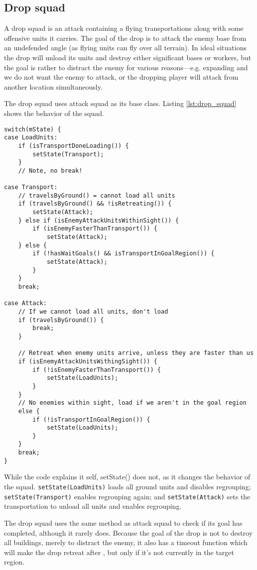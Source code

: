 \subsection{Drop squad}
\label{sec:drop_squad}
A drop squad is an attack containing a flying transportations along with some offensive units it
carries. The goal of the drop is to attack the enemy base from an undefended angle (as flying units
can fly over all terrain). In ideal situations the drop will unload its units and destroy either
significant bases or workers, but the goal is rather to distract the enemy for various reasons—e.g.
expanding and we do not want the enemy to attack, or the dropping player will attack from another
location simultaneously.

The drop squad uses attack squad as its base class. Listing \ref{lst:drop_squad} shows the behavior of the squad.

\clearpage
\begin{lstlisting}[caption={Drop squad behavior},label={lst:drop_squad}]
switch(mState) {
case LoadUnits:
	if (isTransportDoneLoading()) {
		setState(Transport);
	}
	// Note, no break!

case Transport:
	// travelsByGround() = cannot load all units
	if (travelsByGround() && !isRetreating()) {
		setState(Attack);
	} else if (isEnemyAttackUnitsWithinSight()) {
		if (isEnemyFasterThanTransport()) {
			setState(Attack);
	} else {
		if (!hasWaitGoals() && isTransportInGoalRegion()) {
			setState(Attack);
		}
	}
	break;

case Attack:
	// If we cannot load all units, don't load
	if (travelsByGround()) {
		break;
	}

	// Retreat when enemy units arrive, unless they are faster than us
	if (isEnemyAttackUnitsWithingSight()) {
		if (!isEnemyFasterThanTransport()) {
			setState(LoadUnits);
		}
	}
	// No enemies within sight, load if we aren't in the goal region
	else {
		if (!isTransportInGoalRegion()) {
			setState(LoadUnits);
		}
	}
	break;
}
\end{lstlisting}
While the code explains it self, setState() does not, as it changes the behavior of the squad. \texttt{setState(LoadUnits)} loads all ground units and disables regrouping; \texttt{setState(Transport)} enables regrouping again; and \texttt{setState(Attack)} sets the transportation to unload all units and enables regrouping.

The drop squad uses the same method as attack squad to check if its goal has completed, although it rarely does. Because the goal of the drop is not to destroy all buildings, merely to distract the enemy, it also has a timeout function which will make the drop retreat after \squadDropAttackTimeout, but only if it's not currently in the target region.

